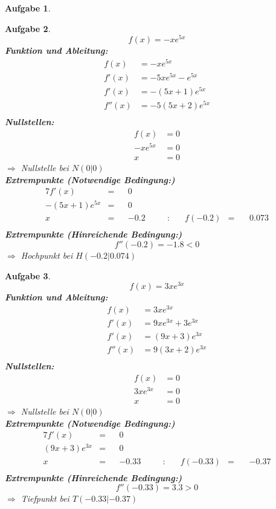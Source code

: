\documentclass[12pt]{article}
\theoremstyle{note}
\newtheorem{aufgabe}{Aufgabe}
\begin{document}
\begin{flushleft}
\begin{aufgabe}
\end{aufgabe}\clearpage\begin{aufgabe} ~  
$$f(x)=- x e^{5 x}$$ 
{\bf Funktion und Ableitung:} 
\begin{align*} 
f(x)&=- x e^{5 x}\\ 
f'(x)&=- 5 x e^{5 x} - e^{5 x}\\ 
f'(x)&=- \left(5 x + 1\right) e^{5 x}\\ 
f''(x)&=- 5 \left(5 x + 2\right) e^{5 x}\\ 
\end{align*} 
{\bf Nullstellen:} 
\begin{align*} 
f(x)&=0 \\ 
- x e^{5 x}&=0 \\ 
x&=0\end{align*} 
$\Rightarrow$ Nullstelle bei $N(0|0)$ \\ 
{\bf Extrempunkte (Notwendige Bedingung:)} 
\begin{alignat*}{7} 
f'(x)&=& &0& \\ 
- \left(5 x + 1\right) e^{5 x}&=& &0& \\ 
x&=& &-0.2& \quad &:& \quad f(-0.2)&=& \, &0.073\\ 
\end{alignat*} 
{\bf Extrempunkte (Hinreichende Bedingung:)} 
\\ 
$$f''(-0.2)=-1.8< 0 $$ 
$\Rightarrow$ Hochpunkt bei $H(-0.2|0.074)$ \\ 

\end{aufgabe}\clearpage\begin{aufgabe} ~  
$$f(x)=3 x e^{3 x}$$ 
{\bf Funktion und Ableitung:} 
\begin{align*} 
f(x)&=3 x e^{3 x}\\ 
f'(x)&=9 x e^{3 x} + 3 e^{3 x}\\ 
f'(x)&=\left(9 x + 3\right) e^{3 x}\\ 
f''(x)&=9 \left(3 x + 2\right) e^{3 x}\\ 
\end{align*} 
{\bf Nullstellen:} 
\begin{align*} 
f(x)&=0 \\ 
3 x e^{3 x}&=0 \\ 
x&=0\end{align*} 
$\Rightarrow$ Nullstelle bei $N(0|0)$ \\ 
{\bf Extrempunkte (Notwendige Bedingung:)} 
\begin{alignat*}{7} 
f'(x)&=& &0& \\ 
\left(9 x + 3\right) e^{3 x}&=& &0& \\ 
x&=& &-0.33& \quad &:& \quad f(-0.33)&=& \, &-0.37\\ 
\end{alignat*} 
{\bf Extrempunkte (Hinreichende Bedingung:)} 
\\ 
$$f''(-0.33)=3.3> 0 $$ 
$\Rightarrow$ Tiefpunkt bei $T(-0.33|-0.37)$ \\ 


\end{aufgabe}
\end{flushleft}
\end{document}
